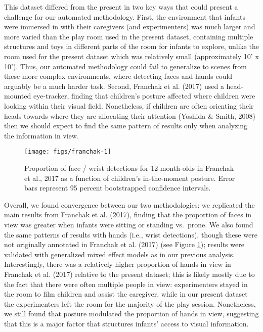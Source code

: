 \documentclass[english,man]{apa6}
\begin{document}
This dataset differed from the present in two key ways that could
present a challenge for our automated methodology. First, the
environment that infants were immersed in with their caregivers (and
experimenters) was much larger and more varied than the play room used
in the present dataset, containing multiple structures and toys in
different parts of the room for infants to explore, unlike the room used
for the present dataset which was relatively small (approximately 10' x
10'). Thus, our automated methodology could fail to generalize to scenes
from these more complex environments, where detecting faces and hands
could arguably be a much harder task. Second, Franchak et al. (2017)
used a head-mounted eye-tracker, finding that children's posture
affected where children were looking within their visual field.
Nonetheless, if children are often orienting their heads towards where
they are allocating their attention (Yoshida \& Smith, 2008) then we
should expect to find the same pattern of results only when analyzing
the information in view.

\begin{figure}[H]

{\centering \texttt{[image: figs/franchak-1]} 

}

\caption{Proportion of face / wrist detections for 12-month-olds in Franchak et al., 2017 as a function of children's in-the-moment posture. Error bars represent 95 percent bootstrapped confidence intervals.}\label{fig:franchak}
\end{figure}

Overall, we found convergence between our two methodologies: we
replicated the main results from Franchak et al. (2017), finding that
the proportion of faces in view was greater when infants were sitting or
standing vs.~prone. We also found the same patterns of results with
hands (i.e., wrist detections), though these were not originally
annotated in Franchak et al. (2017) (see Figure \ref{fig:franchak});
results were validated with generalized mixed effect models as in our
previous analysis. Interestingly, there was a relatively higher
proportion of hands in view in Franchak et al. (2017) relative to the
present dataset; this is likely mostly due to the fact that there were
often multiple people in view: experimenters stayed in the room to film
children and assist the caregiver, while in our present dataset the
experimenters left the room for the majority of the play session.
Nonetheless, we still found that posture modulated the proportion of
hands in view, suggesting that this is a major factor that structures
infants' access to visual information.
\end{document}
